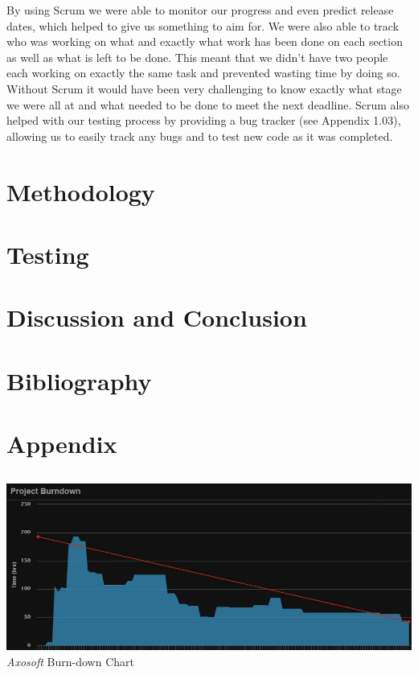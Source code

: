 \documentclass[a4paper]{report}
\begin{document}
By using Scrum we were able to monitor our progress and even predict release dates, which helped to give us something to aim for. We were also able to track who was working on what and exactly what work has been done on each section as well as what is left to be done. This meant that we didn't have two people each working on exactly the same task and prevented wasting time by doing so. Without Scrum it would have been very challenging to know exactly what stage we were all at and what needed to be done to meet the next deadline. Scrum also helped with our testing process by providing a bug tracker (see Appendix 1.03), allowing us to easily track any bugs and to test new code as it was completed. 


\chapter{Methodology}
\chapter{Testing}
\chapter{Discussion and Conclusion}
\chapter{Bibliography}
\appendix
\chapter{Appendix}
\section{}
\subsection{}
	\includegraphics[width=1.0\linewidth]{./appendixImages/AxosoftScreenShot01}
	\textit{Axosoft} Burn-down Chart 
\end{document}
